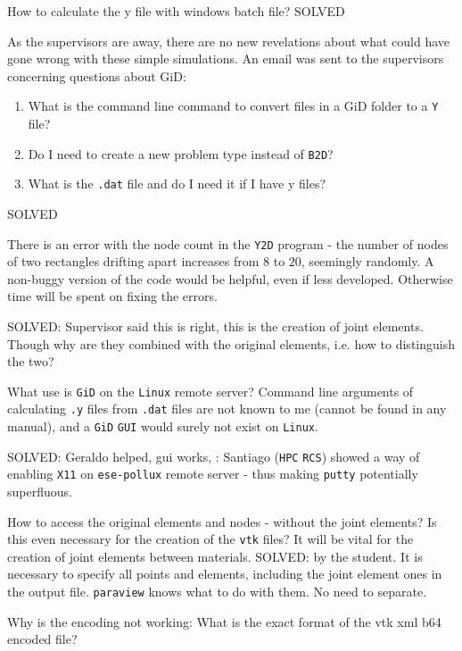 \bigbreak
{} How to calculate the y file with windows batch file?
{\color{green}SOLVED}

\bigbreak
{} As the supervisors are away, there are no new revelations about what could have gone wrong with these simple simulations. An email was sent to the supervisors concerning questions about GiD:

\begin{enumerate}[topsep=0pt,itemsep=-1ex,partopsep=1ex,parsep=1ex,label=\Alph*)]
    \item What is the command line command to convert files in a GiD folder to a \texttt{Y} file?
    \item Do I need to create a new problem type instead of \texttt{B2D}?
    \item What is the \texttt{.dat} file and do I need it if I have y files?
\end{enumerate}
{\color{green}SOLVED}

\bigbreak
{}
There is an error with the node count in the \texttt{Y2D} program - the number of nodes of two rectangles drifting apart increases from $8$ to $20$, seemingly randomly. A non-buggy version of the code would be helpful, even if less developed. Otherwise time will be spent on fixing the errors.

{\color{green}SOLVED}: Supervisor said this is right, this is the creation of joint elements. Though why are they combined with the original elements, i.e. how to distinguish the two?

\bigbreak
What use is \texttt{GiD} on the \texttt{Linux} remote server? Command line arguments of calculating \texttt{.y} files from \texttt{.dat} files are not known to me (cannot be found in any manual), and a \texttt{GiD} \texttt{GUI} would surely not exist on \texttt{Linux}.

{\color{green}SOLVED}: Geraldo helped, gui works, {\color{blue}\textbf{}}: Santiago (\texttt{HPC} \texttt{RCS}) showed a way of enabling \texttt{X11} on \texttt{ese-pollux} remote server - thus making \texttt{putty} potentially superfluous. 

\bigbreak
{}
How to access the original elements and nodes - without the joint elements? Is this even necessary for the creation of the \texttt{vtk} files? It will be vital for the creation of joint elements between materials. {\color{green}SOLVED}: by the student. It is necessary to specify all points and elements, including the joint element ones in the output file. \texttt{paraview} knows what to do with them. No need to separate. 

\bigbreak
{}
Why is the encoding not working: What is the exact format of the vtk xml b64 encoded file?
